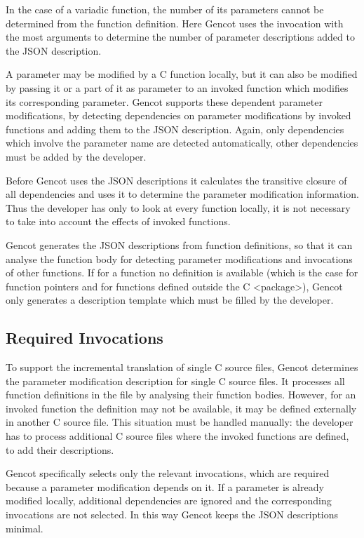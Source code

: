 In the case of a variadic function, the number of its parameters cannot be determined from the function definition.
Here Gencot uses the invocation with the most arguments to determine the number of parameter descriptions added
to the JSON description.

A parameter may be modified by a C function locally, but it can 
also be modified by passing it or a part of it as parameter to an invoked function which modifies its corresponding
parameter. Gencot supports these dependent parameter modifications, by detecting dependencies on parameter
modifications by invoked functions and adding them to the JSON description. Again, only dependencies which
involve the parameter name are detected automatically, other dependencies must be added by the developer.

Before Gencot uses the JSON descriptions it calculates the transitive closure of all dependencies and uses it to
determine the parameter modification information. Thus the developer has only to look at every function locally,
it is not necessary to take into account the effects of invoked functions.

Gencot generates the JSON descriptions from function definitions, so that it can analyse the function body for
detecting parameter modifications and invocations of other functions. If for a function no definition is available 
(which is the case for function pointers and for functions defined outside the C <package>), Gencot only generates 
a description template which must be filled by the developer.

\subsection{Required Invocations}

To support the incremental translation of single C source files, Gencot determines the parameter modification
description for single C source files. It processes all function definitions in the file by analysing their 
function bodies. However, for an invoked function the definition may not be available, it may be defined externally
in another C source file. This situation must be handled manually: the developer has to process additional
C source files where the invoked functions are defined, to add their descriptions.

Gencot specifically selects only the relevant invocations, which are required because a parameter modification depends on it.
If a parameter is already modified locally, additional dependencies are ignored and the corresponding invocations
are not selected. In this way Gencot keeps the JSON descriptions minimal.

